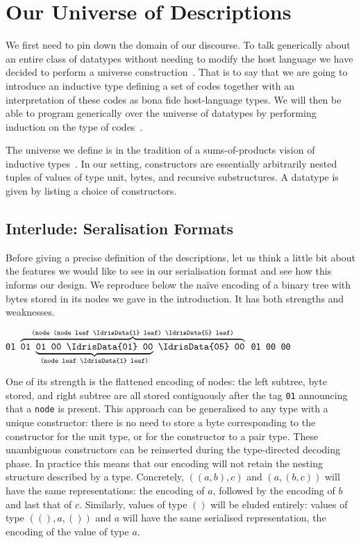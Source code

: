 \section{Our Universe of Descriptions}\label{sec:desc}

We first need to pin down the domain of our discourse.
%
To talk generically about an entire class of datatypes
without needing to modify the host language
we have decided to perform a universe
construction~\citep{DBLP:journals/njc/BenkeDJ03, DBLP:phd/ethos/Morris07, DBLP:conf/icfp/LohM11}.
%
That is to say that we are going to introduce an inductive type
defining a set of codes together
with an interpretation of these codes as bona fide
host-language types.
%
We will then be able to program generically over the universe of
datatypes by performing induction on the type of
codes~\citep{DBLP:conf/tphol/PfeiferR99}.

The universe we define is in the tradition of
a sums-of-products vision of inductive types~\citep{DBLP:conf/popl/JanssonJ97}.
%
In our setting, constructors are essentially arbitrarily nested tuples of
values of type unit,
bytes,
and recursive substructures.
%
A datatype is given by listing a choice of constructors.

\subsection{Interlude: Seralisation Formats}\label{sec:interludeserialisation}

Before giving a precise definition of the descriptions, let us think
a little bit about the features we would like to see in our serialisation
format and see how this informs our design.
%
We reproduce below the naïve encoding of a binary tree with bytes stored
in its nodes we gave in the introduction. It has both strengths and
weaknesses.

\begin{center}
  \usestt
      \texttt{01 $\overbrace{\texttt{01 $\underbrace{\texttt{01 00 \IdrisData{01} 00}}_{\texttt{(node leaf \IdrisData{1} leaf)}}$
    \IdrisData{05} 00}}^{\texttt{(node (node leaf \IdrisData{1} leaf) \IdrisData{5} leaf)}}$
     01 00  00}
\end{center}

One of its strength is the flattened encoding of nodes:
the left subtree, byte stored, and right subtree are all stored
contiguously after the tag \texttt{01} announcing that a \texttt{node} is present.
%
This approach can be generalised to any type with a unique constructor:
there is no need to store a byte corresponding to the constructor for the
unit type, or for the constructor to a pair type. These unambiguous
constructors can be reinserted during the type-directed decoding phase.
%
In practice this means that our encoding will not retain the nesting
structure described by a type. Concretely, $((a, b), c)$ and $(a, (b, c))$
will have the same representations: the encoding of $a$, followed by the
encoding of $b$ and last that of $c$.
%
Similarly, values of type $()$ will be eluded entirely: values of type
$((), a, ())$ and $a$ will have the same serialised representation, the
encoding of the value of type $a$.


